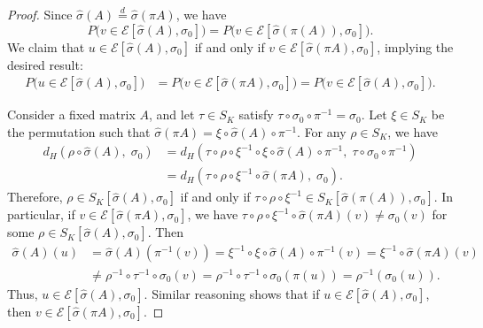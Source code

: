 \documentclass{article}
\begin{document}
\begin{proof}
Since $\hat{\sigma}(A) \stackrel{d}{=} \hat{\sigma}(\pi A)$, we have
\[
P \Big(v \in \mathcal{E}[\hat{\sigma}(A), \sigma_0 ] \Big) = 
       P \Big(v \in \mathcal{E}[\hat{\sigma}(\pi (A)), \sigma_0] \Big).
\]
We claim that $u \in \mathcal{E}[\hat{\sigma}(A), \sigma_0]$ if and only if $v \in \mathcal{E}[\hat{\sigma}(\pi A), \sigma_0]$, implying the desired result:
\begin{align*}
P\Big( u \in \mathcal{E}[\hat{\sigma}(A), \sigma_0]\Big) &= P\Big(v \in \mathcal{E}[ \hat{\sigma}(\pi A), \sigma_0]\Big) = P\Big(v \in \mathcal{E}[\hat{\sigma}(A), \sigma_0]\Big).
\end{align*}

Consider a fixed matrix $A$, and let $\tau \in S_K$ satisfy $\tau \circ \sigma_0 \circ \pi^{-1} = \sigma_0$. Let $\xi \in S_K$ be the permutation such that $\hat{\sigma}(\pi A) = \xi \circ \hat{\sigma}(A) \circ \pi^{-1}$. For any $\rho \in S_K$, we have
\begin{align*}
d_H(\rho \circ \hat{\sigma}(A), \; \sigma_0) &= 
      d_H( \tau \circ \rho \circ \xi^{-1} \circ \xi \circ \hat{\sigma}(A) \circ \pi^{-1}, \; \tau \circ \sigma_0 \circ \pi^{-1} ) \\
  &= d_H( \tau \circ \rho \circ \xi^{-1} \circ \hat{\sigma}(\pi A), \; \sigma_0).
\end{align*}
Therefore, $\rho \in S_K[\hat{\sigma}(A), \sigma_0]$ if and only if $\tau \circ \rho \circ \xi^{-1} \in S_K[\hat{\sigma}(\pi(A)), \sigma_0]$. In particular, if $v \in \mathcal{E}[\hat{\sigma}(\pi A), \sigma_0]$, we have $\tau \circ \rho \circ \xi^{-1} \circ \hat{\sigma}(\pi A)(v) \neq \sigma_0(v)$ for some $\rho \in S_K[\hat{\sigma}(A), \sigma_0]$. Then
\begin{align*}
\hat{\sigma}(A)(u) &= \hat{\sigma}(A)(\pi^{-1}(v)) = \xi^{-1} \circ \xi \circ \hat{\sigma}(A) \circ \pi^{-1} (v) = \xi^{-1} \circ \hat{\sigma}( \pi A) (v) \\
   &\neq \rho^{-1} \circ \tau^{-1} \circ \sigma_0(v) = \rho^{-1} \circ \tau^{-1} \circ \sigma_0( \pi( u )) = \rho^{-1} (\sigma_0(u)).
\end{align*}
Thus, $u \in \mathcal{E}[ \hat{\sigma}(A), \sigma_0]$. Similar reasoning shows that if $u \in \mathcal{E}[ \hat{\sigma}(A), \sigma_0]$, then $v \in \mathcal{E}[\hat{\sigma}(\pi A), \sigma_0]$.
\end{proof}
\end{document}

